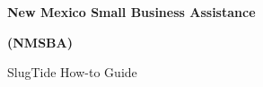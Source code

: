 \documentclass[11pt]{article}
\author{John P. Ortiz}
\date\today
\newcommand\tsup[1]{\textsuperscript{#1}}
\begin{document}

\begin{titlepage}
    \begin{center}
        \vspace*{4.5cm}
        \LARGE
        \textbf{New Mexico Small Business Assistance}

        \textbf{(NMSBA)}
 
        \vspace{0.5cm}
        SlugTide How-to Guide 
 
        \vspace{4.5cm}

% 

    \end{center}
% 
% 
        \vfill
 
 
\end{titlepage}

\cleardoublepage
{}
\end{document}
